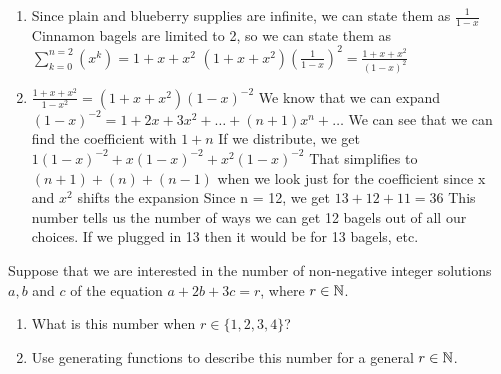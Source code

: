 \documentclass{homework}
\begin{document}
\begin{sol}
  \begin{enumerate}[label=(\alph*)]
    \item Since plain and blueberry supplies are infinite, we can state them as $\frac{1}{1-x}$ \newline
      Cinnamon bagels are limited to 2, so we can state them as $\sum_{k=0}^{n=2}(x^k) = 1 + x + x^2$ \newline
      $(1+x+x^2)(\frac{1}{1-x})^2=\frac{1+x+x^2}{(1-x)^2}$
    \item $\frac{1+x+x^2}{1-x^2}=(1+x+x^2)(1-x)^{-2}$ \newline 
      We know that we can expand $(1-x)^{-2}=1+2x+3x^2+\dots+(n+1)x^n+\dots$ \newline
      We can see that we can find the coefficient with $1+n$ \newline
      If we distribute, we get $1(1-x)^{-2}+x(1-x)^{-2}+x^2(1-x)^{-2}$ \newline
      That simplifies to $(n+1)+(n)+(n-1)$ when we look just for the coefficient since x and $x^2$ shifts the expansion\newline
      Since n = 12, we get $13 + 12 + 11 = 36$ \newline
      This number tells us the number of ways we can get 12 bagels out of all our choices. If we plugged in 13 then it would be for 13 bagels, etc.
  \end{enumerate}
\end{sol}

\question Suppose that we are interested in the number of non-negative integer solutions $a, b$ and $c$ of the equation $a + 2b + 3c = r$, where $r \in \mathbb{N}$.
\begin{enumerate}[label=(\alph*)]
    \item What is this number when $r \in \{1, 2, 3, 4\}$?
    \item Use generating functions to describe this number for a general $r \in \mathbb{N}$.
\end{enumerate}
\end{document}
